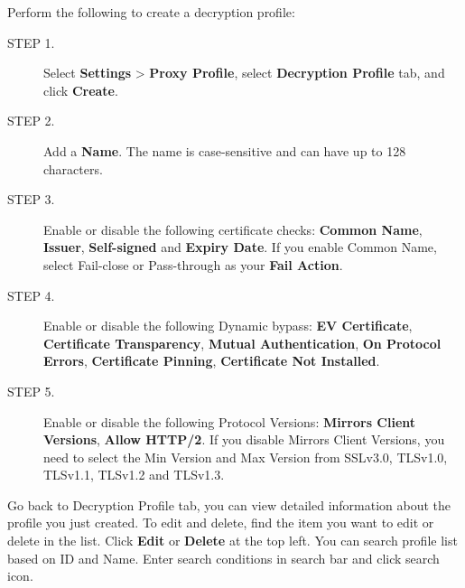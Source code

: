 Perform the following to create a decryption profile:

\begin{description}
    \item[STEP 1.]	Select \textbf{Settings} > \textbf{Proxy Profile}, select \textbf{Decryption Profile} tab, and click \textbf{Create}.
    \item[STEP 2.]	Add a \textbf{Name}. The name is case-sensitive and can have up to 128 characters.
    \item[STEP 3.]	Enable or disable the following certificate checks: \textbf{Common Name}, \textbf{Issuer}, \textbf{Self-signed} and \textbf{Expiry Date}. If you enable Common Name, select Fail-close or Pass-through as your \textbf{Fail Action}. 
    \item[STEP 4.]	Enable or disable the following Dynamic bypass: \textbf{EV Certificate}, \textbf{Certificate Transparency}, \textbf{Mutual Authentication}, \textbf{On Protocol Errors}, \textbf{Certificate Pinning}, \textbf{Certificate Not Installed}.
    \item[STEP 5.]	Enable or disable the following Protocol Versions: \textbf{Mirrors Client Versions}, \textbf{Allow HTTP/2}. If you disable Mirrors Client Versions, you need to select the Min Version and Max Version from SSLv3.0, TLSv1.0, TLSv1.1, TLSv1.2 and TLSv1.3. 
\end{description} 

Go back to Decryption Profile tab, you can view detailed information about the profile you just created. To edit and delete, find the item you want to edit or delete in the list. 
Click \textbf{Edit} or \textbf{Delete} at the top left. You can search profile list based on ID and Name. Enter search conditions in search bar and click search icon.
